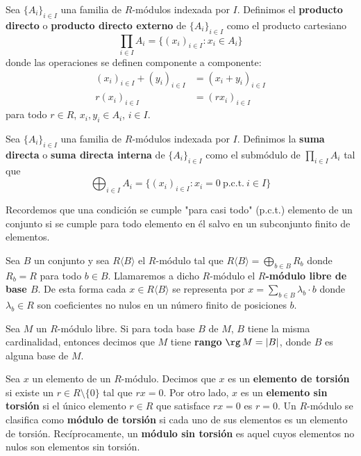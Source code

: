 \begin{definicion}
	Sea $\{A_i\}_{i \in I}$ una familia de $R$-módulos indexada por $I$. Definimos el \textbf{producto directo} o \textbf{producto directo externo} de $\{A_i\}_{i \in I}$ como el producto cartesiano
	\[
		\prod_{i \in I} A_i = \{(x_i)_{i \in I} : x_i \in A_i \}
	\]
	donde las operaciones se definen componente a componente:
	\begin{align*}
		(x_i)_{i \in I} + (y_i)_{i \in I} & = (x_i+y_i)_{i \in I} \\
		r(x_i)_{i \in I}                  & = (rx_i)_{i \in I}
	\end{align*}
	para todo $r \in R$, $x_i,y_i \in A_i$, $i \in I$.
\end{definicion}

\begin{definicion}
	Sea $\{A_i\}_{i \in I}$ una familia de $R$-módulos indexada por $I$. Definimos la \textbf{suma directa} o \textbf{suma directa interna} de $\{A_i\}_{i \in I}$ como el submódulo de $\prod_{i \in I} A_i$ tal que
	\[
		\bigoplus_{i \in I} A_i = \{(x_i)_{i \in I} : x_i = 0 \ \text{p.c.t.} \ i \in I\}
	\]
\end{definicion}
\begin{nota}
	Recordemos que una condición se cumple "para casi todo" (p.c.t.) elemento de un conjunto si se cumple para todo elemento en él salvo en un subconjunto finito de elementos.
\end{nota}
\begin{definicion}
	Sea $B$ un conjunto y sea $R \langle B \rangle$ el $R$-módulo tal que $R \langle B \rangle = \bigoplus_{b \in B}R_b$ donde $R_b=R$ para todo $b \in B$. Llamaremos a dicho $R$-módulo el \textbf{$R$-módulo libre de base $B$}. De esta forma cada $x \in R \langle B \rangle$ se representa por $x = \sum_{b\in B}\lambda_b \cdot b$ donde $\lambda_b \in R$ son coeficientes no nulos en un número finito de posiciones $b$.
\end{definicion}
\begin{definicion}
	Sea \( M \) un \( R \)-módulo libre. Si para toda base \( B \) de \( M \), \( B \) tiene la misma cardinalidad, entonces decimos que \( M \) tiene \textbf{rango} \( \rg \, M = |B| \), donde \( B \) es alguna base de \( M \).
\end{definicion}
\begin{definicion}
	Sea \( x \) un elemento de un \( R \)-módulo. Decimos que \( x \) es un\textbf{ elemento de torsión} si existe un \( r \in R \setminus \{0\} \) tal que \( rx = 0 \). Por otro lado, \( x \) es un \textbf{elemento sin torsión} si el único elemento \( r \in R \) que satisface \( rx = 0 \) es \( r = 0 \). Un \( R \)-módulo se clasifica como \textbf{módulo de torsión} si cada uno de sus elementos es un elemento de torsión. Recíprocamente, un \textbf{módulo sin torsión} es aquel cuyos elementos no nulos son elementos sin torsión.
\end{definicion}

